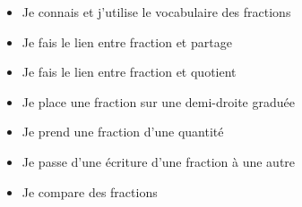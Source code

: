 \vspace*{-0.5cm}

\begin{myobj}
	\begin{itemize}
		
		
		\item Je connais et j'utilise le vocabulaire des fractions
		\item Je fais le lien entre fraction et partage
		\item Je fais le lien entre fraction et quotient
		\item Je place une fraction sur une demi-droite graduée
		\item Je prend une fraction d'une quantité
		\item Je passe d'une écriture d'une fraction à une autre
		\item Je compare des fractions
	
		
	\end{itemize}
\end{myobj}

\vspace*{-0.3cm}
%


